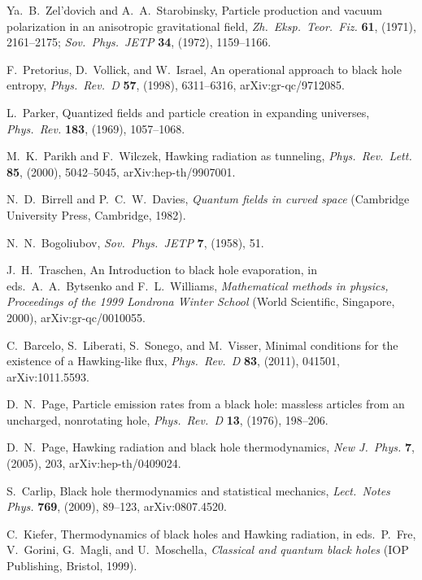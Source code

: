 \documentclass[12pt]{article}
\begin{document}
\begin{thebibliography}{999}
 Ya.~B.\ Zel'dovich and A.~A.\ Starobinsky, 
Particle production and vacuum polarization in an anisotropic 
gravitational field, \emph{Zh.\ Eksp.\ Teor.\ Fiz.} {\bf 61}, 
(1971), 2161--2175; \emph{Sov.\ Phys.\ JETP} {\bf 34}, 
(1972), 1159--1166.

 F.\ Pretorius, D.\ Vollick, and W.\ Israel,
An operational approach to black hole entropy, \emph{Phys.\
Rev.\ D} {\bf 57}, (1998), 6311--6316, arXiv:gr-qc/9712085.

 L.\ Parker, Quantized fields and particle 
creation in expanding universes, \emph{Phys.\ Rev.} {\bf 183}, 
(1969), 1057--1068.

 M.~K.\ Parikh and F.\ Wilczek, Hawking 
radiation as tunneling, \emph{Phys.\ Rev.\ Lett.} {\bf 85}, 
(2000), 5042--5045, arXiv:hep-th/9907001.

  N.~D.\ Birrell and P.~C.~W.\ Davies,
\emph{Quantum fields in curved space} (Cambridge University
Press, Cambridge, 1982).

 N.~N.\ Bogoliubov, 
\emph{Sov.\ Phys.\ JETP} {\bf 7}, (1958), 51.

 J.~H.\ Traschen, An Introduction to black hole 
evaporation, in eds.\ A.~A.\ Bytsenko and F.~L.\ Williams, 
\emph{Mathematical methods in physics, Proceedings of the 1999 
Londrona Winter School}  (World Scientific, Singapore, 2000), 
arXiv:gr-qc/0010055.

 C.\ Barcelo, S.\ Liberati, S.\ Sonego, and M.\ Visser,
Minimal conditions for the existence of a Hawking-like flux,
\emph{Phys.\ Rev.\ D} {\bf 83}, (2011), 041501, arXiv:1011.5593.

 D.~N.\ Page, Particle emission rates from a 
black hole: massless articles from an uncharged, nonrotating 
hole, \emph{Phys.\ Rev.\ D} {\bf 13}, (1976), 198--206.

 D.~N.\ Page, Hawking radiation and black hole 
thermodynamics, \emph{New J.\ Phys.} {\bf 7}, (2005),
203, arXiv:hep-th/0409024.

 S.\ Carlip, Black hole thermodynamics and 
statistical mechanics, \emph{Lect.\ Notes Phys.} {\bf 769},
 (2009), 89--123,  arXiv:0807.4520.

 C.\ Kiefer, Thermodynamics of black holes and 
Hawking radiation, in eds.\ P.\ Fre, V.\ Gorini, G.\ Magli, and 
U.\ Moschella, \emph{Classical and quantum black holes}
(IOP Publishing, Bristol, 1999).


\end{thebibliography}
\end{document}

